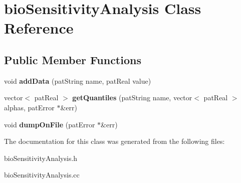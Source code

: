 \hypertarget{classbio_sensitivity_analysis}{}\section{bio\+Sensitivity\+Analysis Class Reference}
\label{classbio_sensitivity_analysis}
\subsection*{Public Member Functions}
\begin{DoxyCompactItemize}
\item 
\mbox{\label{classbio_sensitivity_analysis_addb2893920e82db53309c6b03f360dd5}} 
void {\bfseries add\+Data} (pat\+String name, pat\+Real value)
\item 
\mbox{\label{classbio_sensitivity_analysis_ac31c2070049e6030cf3eff251935e673}} 
vector$<$ pat\+Real $>$ {\bfseries get\+Quantiles} (pat\+String name, vector$<$ pat\+Real $>$ alphas, pat\+Error $\ast$\&err)
\item 
\mbox{\label{classbio_sensitivity_analysis_a8840cb5eedc3bb50ae5e0f998dd032b9}} 
void {\bfseries dump\+On\+File} (pat\+Error $\ast$\&err)
\end{DoxyCompactItemize}


The documentation for this class was generated from the following files\+:\begin{DoxyCompactItemize}
\item 
bio\+Sensitivity\+Analysis.\+h\item 
bio\+Sensitivity\+Analysis.\+cc\end{DoxyCompactItemize}
